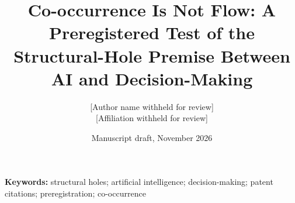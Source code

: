 \documentclass[12pt]{article}
\title{Co-occurrence Is Not Flow: A Preregistered Test of the Structural-Hole Premise Between AI and Decision-Making}
\author{[Author name withheld for review]\\[2pt] [Affiliation withheld for review]}
\date{Manuscript draft, November 2026}
\begin{document}
\maketitle

\begin{abstract}

\end{abstract}

\noindent\textbf{Keywords:} structural holes; artificial intelligence; decision-making; patent citations; preregistration; co-occurrence








\clearpage
\appendix

\end{document}

